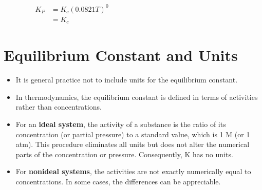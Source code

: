 \documentclass[a4paper,12pt,twocolumn]{article}
\begin{document}
$\begin{aligned}
    \quad \quad \quad \quad K_{P} & =K_{c}(0.0821 T)^{0} \\
    \quad \quad \quad \quad       & =K_{c}               
\end{aligned}$
\section{Equilibrium Constant and Units}
\begin{itemize}
    \item It is general practice not to include units for the equilibrium constant. 
    \item In thermodynamics, the equilibrium constant is defined in terms of activities rather than concentrations. 
    \item For an \textbf{ideal system}, the activity of a substance is the ratio of its concentration (or partial pressure) to a standard value, which is 1 M (or 1 atm). This procedure eliminates all units but does not alter the numerical parts of the concentration or pressure. Consequently, K has no units.
    \item For \textbf{nonideal systems}, the activities are not exactly numerically equal to concentrations. In some cases, the differences can be appreciable.
\end{itemize}
\end{document}
